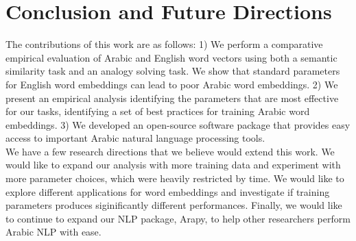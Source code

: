 \section{Conclusion and Future Directions}
\label{sec:conclusion}

The contributions of this work are as follows: 1) We perform a comparative empirical evaluation of Arabic and English word vectors using both a semantic similarity task and an analogy solving task. We show that standard parameters for English word embeddings can lead to poor Arabic word embeddings. 2) We present an empirical analysis identifying the parameters that are most effective for our tasks, identifying a set of best practices for training Arabic word embeddings. 3) We developed an open-source software package that provides easy access to important Arabic natural language processing tools. 
\\
We have a few research directions that we believe would extend this work. We would like to expand our analysis with more training data and experiment with more parameter choices, which were heavily restricted by time. We would like to explore different applications for word embeddings and investigate if training parameters produces siginificantly different performances. Finally, we would like to continue to expand our NLP package, Arapy, to help other researchers perform Arabic NLP with ease.